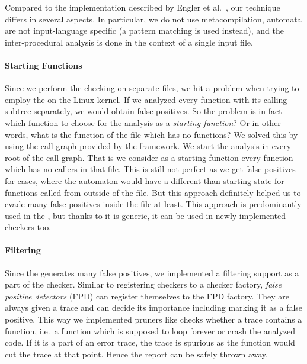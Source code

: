 Compared to the implementation described by Engler et al.~\cite{metacomp,
metal}, our technique differs in several aspects. In particular, we do not use
metacompilation, automata are not input-language specific (a pattern matching
is used instead), and the inter-procedural analysis is done in the context of
a single input file.

\paragraph{Starting Functions}
Since we perform the checking on separate files, we hit a problem when trying
to employ the \AC on the Linux kernel. If we analyzed every function
with its calling subtree separately, we would obtain false positives.
So the problem is in fact which function to choose for the analysis as a
\emph{starting function}?  Or in other words, what is the  function
of the file which has no  functions?  We solved this by using the
call graph provided by the \stan framework. We start the analysis in every
root of the call graph. That is we consider as a starting function every
function which has no callers in that file. This is still not perfect as we
get false positives for cases, where the automaton would have a different
than starting state for functions called from outside of the file. But this
approach definitely helped us to evade many false positives inside the file at
least. This approach is predominantly used in the \AC, but thanks to it is
generic, it can be used in newly implemented checkers too.

\paragraph{Filtering}
Since the \AC generates many false positives, we implemented a filtering
support as a part of the checker. Similar to registering checkers to a
checker factory, \emph{false positive detectors} (FPD) can register themselves
to the \AC FPD factory. They are always given a trace and can decide its
importance including marking it as a false positive. This way we implemented
pruners like checks whether a trace contains a  function, i.e.\
a function which is supposed to loop forever or crash the analyzed code. If it
is a part of an error trace, the trace is spurious as the function would cut
the trace at that point. Hence the report can be safely thrown away.

